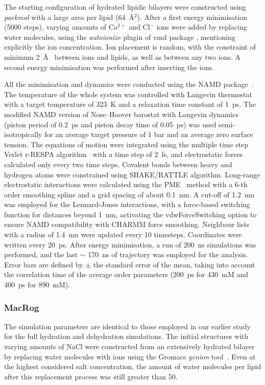 \documentclass[twoside,twocolumn,9pt]{article}
\begin{document}
The starting  configuration of hydrated lipidic bilayers were constructed using {\it packmol} \cite{packmol} 
with a large area per lipid (64~\AA$^{2}$). 
After a first energy minimisation (5000 steps),
varying amounts of Ca$^{2+}$ and Cl$^-$ ions were added  by replacing water molecules,
using the {\it autoionize} plugin of vmd package \cite{hump96},
mentioning explicitly the ion concentration.
Ion placement is random, with the constraint of  minimum 2~\AA~ between ions and lipids,
as well as between any two ions. A second energy minimisation was performed after inserting the ions.
 
All the minimisation and dynamics were conducted using the NAMD package~\cite{NAMD}.
The temperature of the whole system was controlled with Langevin thermostat with a target temperature of 323~K 
and a relaxation time constant of 1~ps.  The modified NAMD version of Nose--Hoover barostat with Langevin dynamics
(piston period of 0.2~ps and piston decay time of 0.05~ps) was used semi-isotropically
for an average target pressure of 1 bar and an average zero surface tension. 
The equations of motion were integrated using the multiple time step Verlet r-RESPA algorithm~\cite{pall13}
with a time step of 2~fs, and electrostatic forces calculated only every two time steps. Covalent
bonds between heavy and hydrogen atoms were constrained using SHAKE/RATTLE algorithm.
Long-range electrostatic interactions were calculated using the PME~\cite{darden93,essman95} method 
with a 6-th order smoothing spline and a grid spacing of about 0.1~nm.
A cut-off of 1.2~nm was employed for the Lennard-Jones
interactions, with a force-based switching function for distances beyond 1~nm,
activating the vdwForceSwitching option to ensure NAMD
compatibility with CHARMM force smoothing. Neighbour
lists with a radius of 1.4~nm were updated every 10 timesteps.
Coordinates were written every 20~ps. After energy minimisation, a run of  200~ns simulations was performed,
and the last $\sim$ 170~ns 
of  trajectory was employed for the analysis.
Error bars are defined by $\pm$ the standard error of the mean, 
taking into account the correlation time of the average order parameters 
(200~ps for 430~mM and 400~ps for 890~mM). 


\subsubsection{MacRog}
The simulation parameters are identical to those employed in our earlier study~\cite{botan15} for the full 
hydration and dehydration simulations. The initial structures with varying amounts of NaCl were constructed from an 
extensively hydrated bilayer by replacing water molecules with ions using the Gromacs {\it genion} tool~\cite{gromacsMANUAL}. Even at the highest 
considered salt concentration, the amount of water molecules per lipid after this replacement process was still greater than 50.
\end{document}
